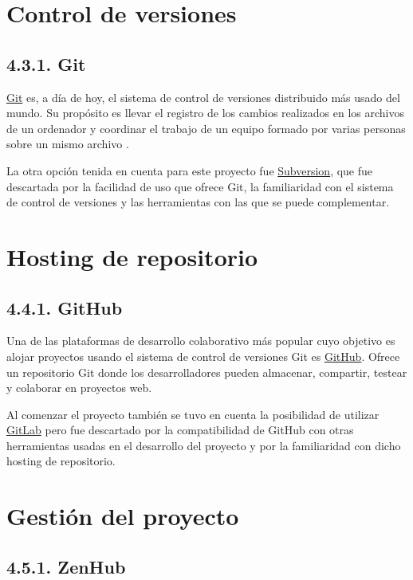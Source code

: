 \section{Control de versiones}

\subsection{4.3.1. Git}

\href{https://git-scm.com/}{Git} es, a día de hoy, el sistema de control de versiones distribuido más usado del mundo. Su propósito es llevar el registro de los cambios realizados en los archivos de un ordenador y coordinar el trabajo de un equipo formado por varias personas sobre un mismo archivo \cite{web:Git}.

La otra opción tenida en cuenta para este proyecto fue \href{https://subversion.apache.org/}{Subversion}, que fue descartada por la facilidad de uso que ofrece Git, la familiaridad con el sistema de control de versiones y las herramientas con las que se puede complementar.

\section{Hosting de repositorio}

\subsection{4.4.1. GitHub}

Una de las plataformas de desarrollo colaborativo más popular cuyo objetivo es alojar proyectos usando el sistema de control de versiones Git es \href{https://github.com/}{GitHub}. Ofrece un repositorio Git donde los desarrolladores pueden almacenar, compartir, testear y colaborar en proyectos web.

Al comenzar el proyecto también se tuvo en cuenta la posibilidad de utilizar \href{https://about.gitlab.com/}{GitLab} pero fue descartado por la compatibilidad de GitHub con otras herramientas usadas en el desarrollo del proyecto y por la familiaridad con dicho hosting de repositorio.

\section{Gestión del proyecto }

\subsection{4.5.1. ZenHub}

